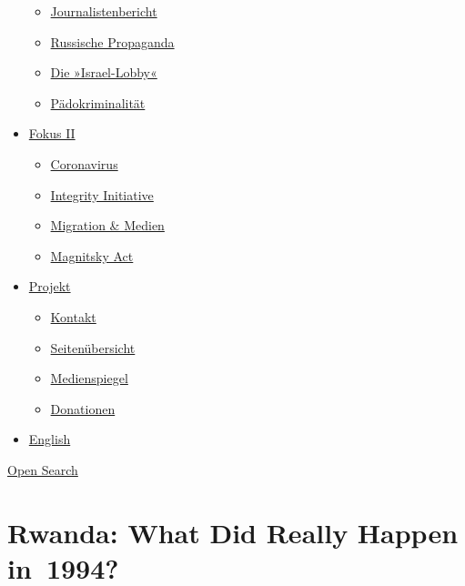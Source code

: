 \begin{itemize}
  \begin{itemize}
  \tightlist
  \item
    \href{https://swprs.org/bericht-eines-journalisten/}{Journalistenbericht}
  \item
    \href{https://swprs.org/russische-propaganda/}{Russische Propaganda}
  \item
    \href{https://swprs.org/die-israel-lobby-fakten-und-mythen/}{Die
    »Israel-Lobby«}
  \item
    \href{https://swprs.org/geopolitik-und-paedokriminalitaet/}{Pädokriminalität}
  \end{itemize}
\item
  \href{https://swprs.org/migration-und-medien/}{Fokus II}

  \begin{itemize}
  \tightlist
  \item
    \href{https://swprs.org/covid-19-hinweis-ii/}{Coronavirus}
  \item
    \href{https://swprs.org/die-integrity-initiative/}{Integrity
    Initiative}
  \item
    \href{https://swprs.org/migration-und-medien/}{Migration \& Medien}
  \item
    \href{https://swprs.org/der-fall-magnitsky/}{Magnitsky Act}
  \end{itemize}
\item
  \href{https://swprs.org/kontakt/}{Projekt}

  \begin{itemize}
  \tightlist
  \item
    \href{https://swprs.org/kontakt/}{Kontakt}
  \item
    \href{https://swprs.org/uebersicht/}{Seitenübersicht}
  \item
    \href{https://swprs.org/medienspiegel/}{Medienspiegel}
  \item
    \href{https://swprs.org/donationen/}{Donationen}
  \end{itemize}
\item
  \href{https://swprs.org/contact/}{English}
\end{itemize}

\protect\hyperlink{}{Open Search}

\hypertarget{rwanda-what-did-really-happen-in-1994}{%
\section{Rwanda: What Did Really Happen
in~1994?}\label{rwanda-what-did-really-happen-in-1994}}

